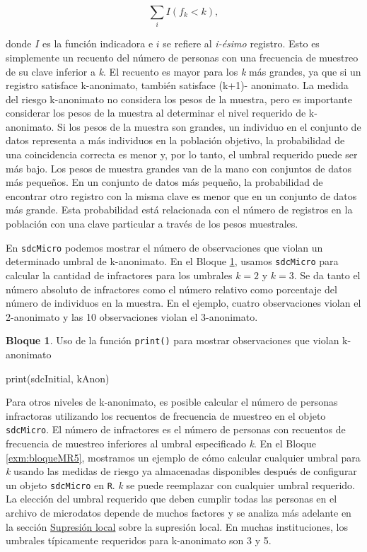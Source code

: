 \documentclass[
]{book}
\newenvironment{Shaded}{\begin{snugshade}}{\end{snugshade}}
\newcommand{\FunctionTok}[1]{\textcolor[rgb]{0.00,0.00,0.00}{#1}}
\newcommand{\NormalTok}[1]{#1}
\newcommand{\StringTok}[1]{\textcolor[rgb]{0.31,0.60,0.02}{#1}}
\theoremstyle{definition}
\theoremstyle{definition}
\newtheorem{example}{Bloque}[chapter]
\theoremstyle{definition}
\theoremstyle{definition}
\theoremstyle{remark}
\begin{document}
\[ \sum_{i} I(f_{k}<k), \]

donde \(I\) es la función indicadora e \(i\) se refiere al \emph{i-ésimo} registro. Esto es simplemente un recuento del número de personas con una frecuencia de muestreo de su clave inferior a \emph{k}. El recuento es mayor para los \emph{k} más grandes, ya que si un registro satisface k-anonimato, también satisface (k+1)- anonimato. La medida del riesgo k-anonimato no considera los pesos de la muestra, pero es importante considerar los pesos de la muestra al determinar el nivel requerido de k-anonimato. Si los pesos de la muestra son grandes, un individuo en el conjunto de datos representa a más individuos en la población objetivo, la probabilidad de una coincidencia correcta es menor y, por lo tanto, el umbral requerido puede ser más bajo. Los pesos de muestra grandes van de la mano con conjuntos de datos más pequeños. En un conjunto de datos más pequeño, la probabilidad de encontrar otro registro con la misma clave es menor que en un conjunto de datos más grande. Esta probabilidad está relacionada con el número de registros en la población con una clave particular a través de los pesos muestrales.

En \texttt{sdcMicro} podemos mostrar el número de observaciones que violan un determinado umbral de k-anonimato. En el Bloque \ref{exm:bloqueMR4}, usamos \texttt{sdcMicro} para calcular la cantidad de infractores para los umbrales \(k=2\) y \(k=3\). Se da tanto el número absoluto de infractores como el número relativo como porcentaje del número de individuos en la muestra. En el ejemplo, cuatro observaciones violan el 2-anonimato y las 10 observaciones violan el 3-anonimato.

\begin{example}
\protect\hypertarget{exm:bloqueMR4}{}\label{exm:bloqueMR4}Uso de la función \texttt{print()} para mostrar observaciones que violan k-anonimato
\end{example}

\begin{Shaded}
\begin{Highlighting}[]
\FunctionTok{print}\NormalTok{(sdcInitial, }\StringTok{\textquotesingle{}kAnon\textquotesingle{}}\NormalTok{)}
\end{Highlighting}
\end{Shaded}

Para otros niveles de k-anonimato, es posible calcular el número de personas infractoras utilizando los recuentos de frecuencia de muestreo en el objeto \texttt{sdcMicro}. El número de infractores es el número de personas con recuentos de frecuencia de muestreo inferiores al umbral especificado \emph{k}. En el Bloque \ref{exm:bloqueMR5}, mostramos un ejemplo de cómo calcular cualquier umbral para \emph{k} usando las medidas de riesgo ya almacenadas disponibles después de configurar un objeto \texttt{sdcMicro} en \texttt{R}. \emph{k} se puede reemplazar con cualquier umbral requerido. La elección del umbral requerido que deben cumplir todas las personas en el archivo de microdatos depende de muchos factores y se analiza más adelante en la sección \protect\hyperlink{sup-loc}{Supresión local} sobre la supresión local. En muchas instituciones, los umbrales típicamente requeridos para k-anonimato son 3 y 5.
\end{document}
